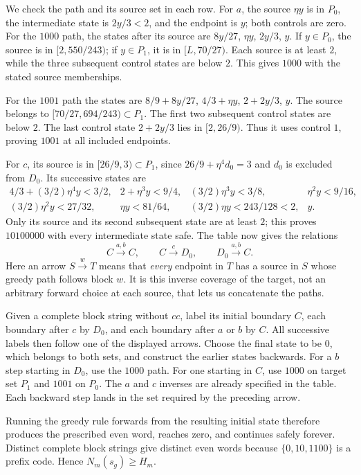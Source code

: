 \documentclass[11pt,reqno]{amsart}
\numberwithin{equation}{section}
\theoremstyle{definition}
\theoremstyle{definition}
\begin{document}
We check the path and its source set in each row. For $a$, the source
$\eta y$ is in $P_0$, the intermediate state is $2y/3<2$,
and the endpoint is $y$; both controls are zero.
For the $1000$ path, the states after its source are
$8y/27$, $\eta y$, $2y/3$, $y$. If $y\in P_0$, the
source is in $[2,550/243)$; if $y\in P_1$, it is in
$[L,70/27)$. Each source is at least $2$, while the three subsequent control states are
below $2$. This gives $1000$ with the stated source memberships.

For the $1001$ path the states are
$8/9+8y/27$, $4/3+\eta y$, $2+2y/3$, $y$.
The source belongs to $[70/27,694/243)\subset P_1$.
The first two subsequent control states are below $2$.
The last control state $2+2y/3$ lies in $[2,26/9)$.
Thus it uses control $1$, proving $1001$ at all included endpoints.

For $c$, its source is in $[26/9,3)\subset P_1$, since
$26/9+\eta^4d_0=3$ and $d_0$ is excluded from $D_0$.
Its successive states are
\[
\begin{array}{llll}
4/3+(3/2)\eta^4y<3/2,&2+\eta^3y<9/4,&
(3/2)\eta^3y<3/8,&\eta^2y<9/16,\\
(3/2)\eta^2y<27/32,&\eta y<81/64,&
(3/2)\eta y<243/128<2,&y.
\end{array}
\]
Only its source and its second subsequent state are at least $2$;
this proves $10100000$ with every intermediate state safe.
The table now gives the relations
\[
 C\xrightarrow{a,b}C,\qquad C\xrightarrow cD_0,
 \qquad D_0\xrightarrow{a,b}C.
\]
Here an arrow $S\xrightarrow{w}T$ means that \emph{every}
endpoint in $T$ has a source in $S$ whose greedy path follows
block $w$. It is this inverse coverage of the target, not an
arbitrary forward choice at each source, that lets us concatenate
the paths.

Given a complete block string without $cc$, label its initial
boundary $C$, each boundary after $c$ by $D_0$, and each boundary
after $a$ or $b$ by $C$. All successive labels then follow one of
the displayed arrows. Choose the final state to be $0$, which
belongs to both sets, and construct the earlier states backwards.
For a $b$ step starting in $D_0$, use the $1000$ path.
For one starting in $C$, use $1000$ on target set $P_1$
and $1001$ on $P_0$. The $a$ and $c$ inverses are already
specified in the table. Each backward step lands in the set
required by the preceding arrow.

Running the greedy rule forwards from the resulting initial state
therefore produces the prescribed even word, reaches zero, and
continues safely forever. Distinct complete block strings give
distinct even words because $\{0,10,1100\}$ is a prefix code.
Hence $N_m(s_g)\ge H_m$.
\end{document}

